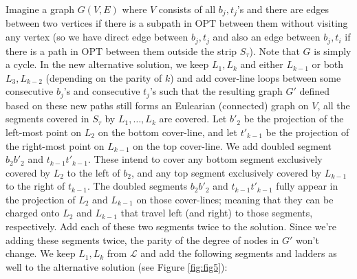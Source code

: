 \documentclass[pdflatex,sn-mathphys-num]{sn-jnl}
\theoremstyle{thmstyleone}
\newcommand{\OPT}{{\text{OPT}}}
\begin{document}
    Imagine a graph $G(V,E)$ where $V$ consists of all $b_j,t_j$'s and there are edges between two vertices if there is a subpath in $\OPT$ between them without visiting any vertex (so we have direct edge between $b_j,t_j$ and also an edge between $b_j,t_i$ if there is a path in $\OPT$ between them outside the strip  $S_\tau$).
    Note that $G$ is simply a cycle. In the new alternative solution, we keep $L_1,L_k$ and either $L_{k-1}$ or both $L_3,L_{k-2}$ (depending on the parity of $k$) and add
    cover-line loops between some consecutive $b_j$'s and consecutive $t_j$'s such that the resulting graph $G'$ defined based on these new paths still forms an Eulearian (connected) graph on $V$, all the segments covered in $S_\tau$ by  $L_1,\ldots,L_k$ are covered.
 Let $b'_2$ be the projection of the left-most point on $L_2$ on the bottom cover-line, and let $t'_{k - 1}$ be the projection of the right-most point on $L_{k - 1}$ on the top cover-line. 
    We add doubled segment $b_2b'_2$ and $t_{k-1}t'_{k-1}$. These intend to cover any bottom segment exclusively covered by $L_2$ to the left of $b_2$, and any top segment exclusively covered by $L_{k-1}$ to the right of $t_{k-1}$. 
The doubled segments $b_2b'_2$ and $t_{k - 1}t'_{k - 1}$ fully appear in the projection of $L_2$ and $L_{k - 1}$ on those cover-lines; meaning that they can be charged onto $L_2$ and $L_{k - 1}$ that travel left (and right)  to those segments, respectively. Add each of these two segments twice to the solution. Since we're adding these segments twice, the parity of the degree of nodes in $G'$ won't change. 
    We keep $L_1,L_k$ from $\mathcal L$ and add the following segments and ladders as well to the alternative solution (see Figure \ref{fig:fig5}):
\end{document}
